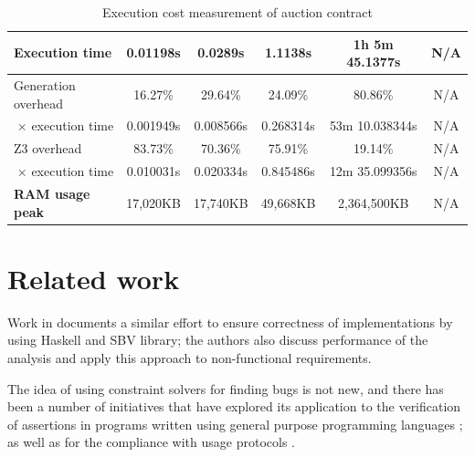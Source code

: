 \documentclass[english,runningheads]{llncs}
\begin{document}
\begin{table}[]
{\begin{tabular}{l||lllll}
\textbf{Execution time}                & \multicolumn{1}{c|}{0.01198s} & \multicolumn{1}{c|}{0.0289s}  & \multicolumn{1}{c|}{1.1138s}  & \multicolumn{1}{c|}{1h 5m 45.1377s} & \multicolumn{1}{c}{\color[HTML]{888888} N/A} \\ \hline
Generation overhead                    & \multicolumn{1}{c|}{16.27\%}  & \multicolumn{1}{c|}{29.64\%}  & \multicolumn{1}{c|}{24.09\%}  & \multicolumn{1}{c|}{80.86\%}        & \multicolumn{1}{c}{\color[HTML]{888888} N/A} \\ \hline
\multicolumn{1}{r||}{× execution time} & \multicolumn{1}{c|}{0.001949s}  & \multicolumn{1}{c|}{0.008566s}  & \multicolumn{1}{c|}{0.268314s}  & \multicolumn{1}{c|}{53m 10.038344s}   & \multicolumn{1}{c}{\color[HTML]{888888} N/A} \\ \hline
Z3 overhead                            & \multicolumn{1}{c|}{83.73\%}  & \multicolumn{1}{c|}{70.36\%}  & \multicolumn{1}{c|}{75.91\%}  & \multicolumn{1}{c|}{19.14\%}        & \multicolumn{1}{c}{\color[HTML]{888888} N/A} \\ \hline
\multicolumn{1}{r||}{× execution time} & \multicolumn{1}{c|}{0.010031s}  & \multicolumn{1}{c|}{0.020334s}  & \multicolumn{1}{c|}{0.845486s}  & \multicolumn{1}{c|}{12m 35.099356s}   & \multicolumn{1}{c}{\color[HTML]{888888} N/A} \\ \hline
\textbf{RAM usage peak}                & \multicolumn{1}{c|}{17,020KB} & \multicolumn{1}{c|}{17,740KB} & \multicolumn{1}{c|}{49,668KB} & \multicolumn{1}{c|}{2,364,500KB}    & \multicolumn{1}{c}{\color[HTML]{888888} N/A}
\end{tabular}
}
\caption{Execution cost measurement of auction contract\label{table1}}
\end{table}


\section{Related work}

Work in \cite{mokhov2019formal} documents a similar effort to ensure
correctness of implementations by using Haskell and SBV library; the
authors also discuss performance of the analysis and apply this approach
to non-functional requirements.

The idea of using constraint solvers for finding bugs is not new,
and there has been a number of initiatives that have explored its
application to the verification of assertions in programs written
using general purpose programming languages \cite{gulwani2008program,jackson2000finding};
as well as for the compliance with usage protocols
\cite{ball2001automatically,xie2005saturn}.
\end{document}
